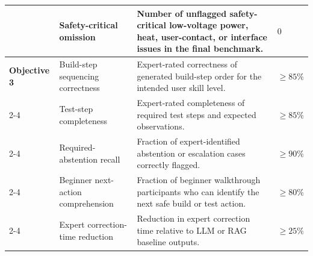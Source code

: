 \begin{table}[H]
{\begin{tabular}{p{} p{} p{} p{}}
& Safety-critical omission 
& Number of unflagged safety-critical low-voltage power, heat, user-contact, or interface issues in the final benchmark. 
& $0$ \\
\hline

\textbf{Objective 3} 
& Build-step sequencing correctness 
& Expert-rated correctness of generated build-step order for the intended user skill level. 
& $\geq 85\%$ \\
\cline{2-4}

& Test-step completeness 
& Expert-rated completeness of required test steps and expected observations. 
& $\geq 85\%$ \\
\cline{2-4}

& Required-abstention recall 
& Fraction of expert-identified abstention or escalation cases correctly flagged. 
& $\geq 90\%$ \\
\cline{2-4}

& Beginner next-action comprehension 
& Fraction of beginner walkthrough participants who can identify the next safe build or test action. 
& $\geq 80\%$ \\
\cline{2-4}

& Expert correction-time reduction 
& Reduction in expert correction time relative to LLM or RAG baseline outputs. 
& $\geq 25\%$ \\
\hline

\end{tabular}}
\end{table}




